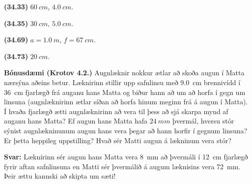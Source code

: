 \ifdefined \wholebook \else\documentclass[oneside]{book}\usepackage{EdlBook}\graphicspath{{figures/}}
\begin{document}
\begin{tcolorbox}
\begin{enumerate*}[label = ]
  \item \textbf{(34.33)} $\SI{60}{cm}$, $\SI{4.0}{cm}$.
  \item \textbf{(34.35)} $\SI{30}{cm}$, $\SI{5.0}{cm}$.
  \item \textbf{(34.69)} $a = \SI{1.0}{m}$, $f = \SI{67}{cm}$.
  \item \textbf{(34.73)} $\SI{20}{cm}$.
\end{enumerate*}
\end{tcolorbox}

\vspace{2cm}

\textbf{Bónusdæmi (Krotov 4.2.)} Augnlæknir nokkur ætlar að skoða augun í Matta nærsýna aðeins betur. Læknirinn stillir upp safnlinsu með \SI{9.0}{cm} brennivídd í \SI{36}{cm} fjarlægð frá auganu hans Matta og biður hann að um að horfa í gegn um linsuna (augnlæknirinn ætlar síðan að horfa hinum meginn frá á augun í Matta). Í hvaða fjarlægð ætti augnlæknirinn að vera til þess að sjá skarpa mynd af auganu hans Matta? Ef augun hans Matta hafa $\SI{24}{mm}$ þvermál, hversu stór sýnist augnlækninunum augun hans vera þegar að hann horfir í gegnum linsuna? Er þetta heppileg uppstilling? Hvað sér Matti augun á lækninum vera stór?

\vspace{0.3cm}

\textbf{Svar:} Læknirinn sér augun hans Matta vera \SI{8}{mm} að þvermáli í \SI{12}{cm} fjarlægð fyrir aftan safnlinsuna en Matti sér þvermálið á augum læknisins vera \SI{72}{mm}. Þeir ættu kannski að skipta um sæti!

\newpage







\ifdefined \wholebook \else
 \printindex
\end{document}
